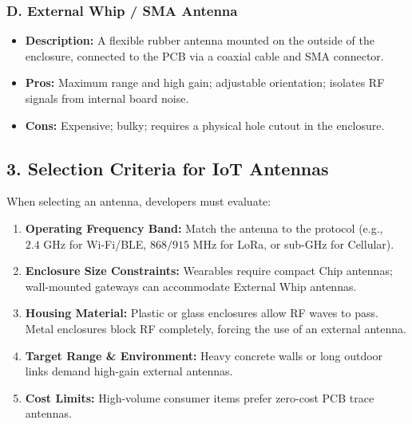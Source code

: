 \subsubsection{D. External Whip / SMA Antenna}
\begin{itemize}
  \item   \textbf{Description:} A flexible rubber antenna mounted on the outside of the enclosure, connected to the PCB via a coaxial cable and SMA connector.
  \item   \textbf{Pros:} Maximum range and high gain; adjustable orientation; isolates RF signals from internal board noise.
  \item   \textbf{Cons:} Expensive; bulky; requires a physical hole cutout in the enclosure.
\end{itemize}


\subsection{3. Selection Criteria for IoT Antennas}
When selecting an antenna, developers must evaluate:
\begin{enumerate}
  \item \textbf{Operating Frequency Band:} Match the antenna to the protocol (e.g., $2.4\text{ GHz}$ for Wi-Fi/BLE, $868/915\text{ MHz}$ for LoRa, or sub-GHz for Cellular).
  \item \textbf{Enclosure Size Constraints:} Wearables require compact Chip antennas; wall-mounted gateways can accommodate External Whip antennas.
  \item \textbf{Housing Material:} Plastic or glass enclosures allow RF waves to pass. Metal enclosures block RF completely, forcing the use of an external antenna.
  \item \textbf{Target Range \& Environment:} Heavy concrete walls or long outdoor links demand high-gain external antennas.
  \item \textbf{Cost Limits:} High-volume consumer items prefer zero-cost PCB trace antennas.
\end{enumerate}


